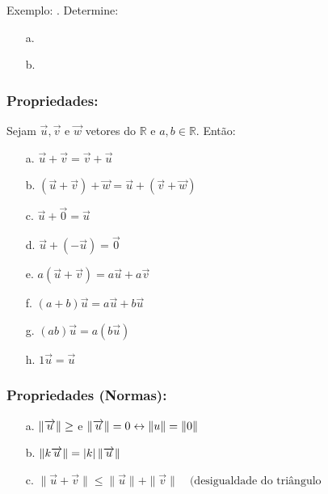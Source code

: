 \date{08-10-2024}

Exemplo: .
Determine: \\
\begin{itemize}
    \item[a.] \mathexpr{}
    \item[b. ]  
\end{itemize}

\subsubsection{Propriedades:}

Sejam $\overrightarrow{u}, \overrightarrow{v}$ e $\overrightarrow{w}$ vetores do $\mathbb{R}$ e $a,b \in \mathbb{R}$.
Então: \\
\begin{itemize}
    \item[a.] $\overrightarrow{u} + \overrightarrow{v} = \overrightarrow{v} + \overrightarrow{u}$
    \item[b.] $(\overrightarrow{u}+ \overrightarrow{v}) + \overrightarrow{w} = \overrightarrow{u} + (\overrightarrow{v} + \overrightarrow{w})$  
    \item[c.] $\overrightarrow{u} + \overrightarrow{0} = \overrightarrow{u}$ 
    \item[d.] $\overrightarrow{u} + (-\overrightarrow{u}) = \overrightarrow{0}$ 
    \item[e.] $a (\overrightarrow{u} + \overrightarrow{v}) = a \overrightarrow{u} + a \overrightarrow{v}$
    \item[f.] $(a+b) \overrightarrow{u} = a \overrightarrow{u} + b \overrightarrow{u}$ 
    \item[g.] $(ab) \overrightarrow{u} = a (b \overrightarrow{u})$
    \item[h.] $1 \overrightarrow{u} = \overrightarrow{u}$ 
\end{itemize}

\subsubsection{Propriedades (Normas):}
\begin{itemize}
    \item[a.] $\left\lVert \overrightarrow{u} \right\rVert \geq$ e $\left\lVert \overrightarrow{u} \right\rVert = 0 \leftrightarrow \left\lVert u \right\rVert = \left\lVert 0 \right\rVert$
    \item[b.] $\left\lVert k \overrightarrow{u} \right\rVert = |k| \left\lVert \overrightarrow{u} \right\rVert$ 
    \item[c.] $ \|\vec{u} + \vec{v}\| \leq \|\vec{u}\| + \|\vec{v}\| \quad (\text{desigualdade do triângulo}$ 
\end{itemize}

